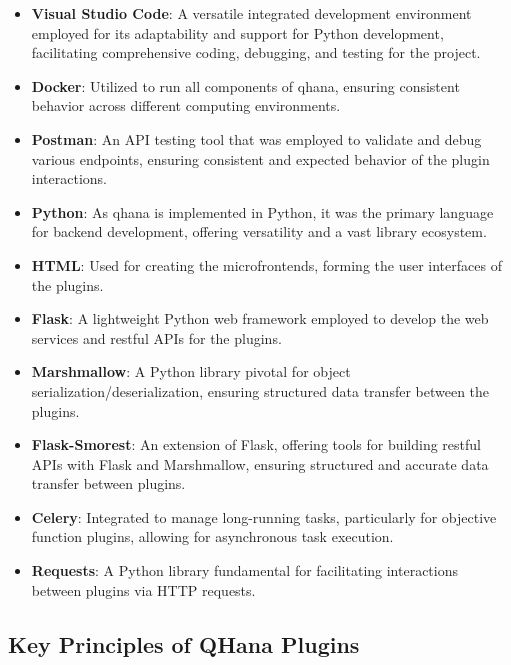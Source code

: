 \documentclass[
  a4paper,  %
  twoside,  %
  bibliography=totoc,
  headsepline,
  cleardoublepage=empty,
  parskip=half,
  draft=false
]{scrbook}
\begin{document}
\begin{itemize}
    \item \textbf{Visual Studio Code}: A versatile integrated development environment employed for its adaptability and support for Python development, facilitating comprehensive coding, debugging, and testing for the project.

    \item \textbf{Docker}: Utilized to run all components of \gls{qhana}, ensuring consistent behavior across different computing environments.

    \item \textbf{Postman}: An API testing tool that was employed to validate and debug various endpoints, ensuring consistent and expected behavior of the plugin interactions.

    \item \textbf{Python}: As \gls{qhana} is implemented in Python, it was the primary language for backend development, offering versatility and a vast library ecosystem.

    \item \textbf{HTML}: Used for creating the microfrontends, forming the user interfaces of the plugins.

    \item \textbf{Flask}: A lightweight Python web framework employed to develop the web services and \gls{rest}ful APIs for the plugins.

    \item \textbf{Marshmallow}: A Python library pivotal for object serialization/deserialization, ensuring structured data transfer between the plugins.

    \item \textbf{Flask-Smorest}: An extension of Flask, offering tools for building \gls{rest}ful APIs with Flask and Marshmallow, ensuring structured and accurate data transfer between plugins.

    \item \textbf{Celery}: Integrated to manage long-running tasks, particularly for objective function plugins, allowing for asynchronous task execution.

    \item \textbf{Requests}: A Python library fundamental for facilitating interactions between plugins via HTTP requests.
\end{itemize}

\subsection{Key Principles of QHana Plugins}
\end{document}
